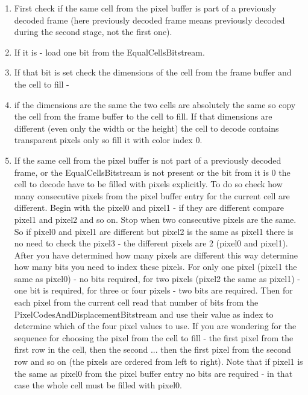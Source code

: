\begin{enumerate}

\item First check if the same cell from the pixel buffer is part of a previously decoded frame (here previously decoded frame means previously decoded during the second stage, not the first one). 
\item If it is - load one bit from the EqualCellsBitstream. 
\item If that bit is set check the dimensions of the cell from the frame buffer and the cell to fill - 
\item if the dimensions are the same the two cells are absolutely the same so copy the cell from the frame buffer to the cell to fill. If that dimensions are different (even only the width or the height) the cell to decode contains transparent pixels only so fill it with color index 0.


\item If the same cell from the pixel buffer is not part of a previously decoded frame, or the EqualCellsBitstream is not present or the bit from it is 0 the cell to decode have to be filled with pixels explicitly. To do so check how many consecutive pixels from the pixel buffer entry for the current cell are different. Begin with the pixel0 and pixel1 - if they are different compare pixel1 and pixel2 and so on. Stop when two consecutive pixels are the same. So if pixel0 and pixel1 are different but pixel2 is the same as pixel1 there is no need to check the pixel3 - the different pixels are 2 (pixel0 and pixel1). After you have determined how many pixels are different this way determine how many bits you need to index these pixels. For only one pixel (pixel1 the same as pixel0) - no bits required, for two pixels (pixel2 the same as pixel1) - one bit is required, for three or four pixels - two bits are required. Then for each pixel from the current cell read that number of bits from the PixelCodesAndDisplacementBitstream and use their value as index to determine which of the four pixel values to use. If you are wondering for the sequence for choosing the pixel from the cell to fill - the first pixel from the first row in the cell, then the second ... then the first pixel from the second row and so on (the pixels are ordered from left to right). Note that if pixel1 is the same as pixel0 from the pixel buffer entry no bits are required - in that case the whole cell must be filled with pixel0.
\end{enumerate}

